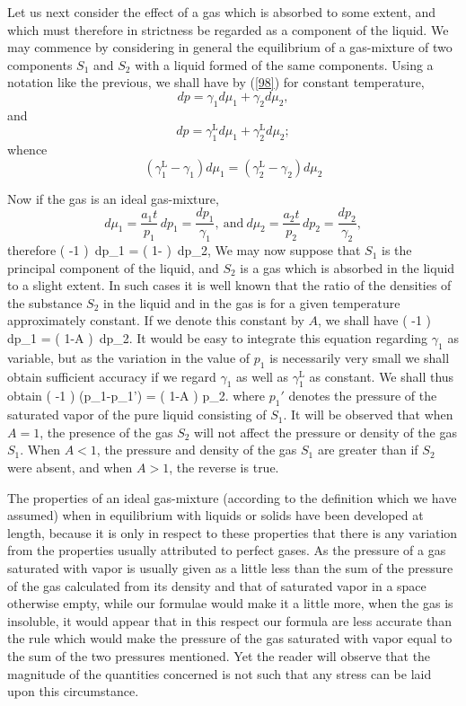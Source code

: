 \documentclass[12pt]{article}
\begin{document}
Let us next consider the effect of a gas which is absorbed to some extent, and which must therefore in strictness be regarded as a component of the liquid. We may commence by considering in general the equilibrium of a gas-mixture of two components $S_1$ and $S_2$ with a liquid formed of the same components. Using a notation like the previous, we shall have by (\ref{98}) for constant temperature,
$$dp = \gamma_1 d \mu_1 + \gamma_2 d\mu_2,  $$
and                  $$dp = \gamma_1^{\text{L}} d \mu_1 + \gamma_2^{\text{L}} d\mu_2;$$
whence             $$(\gamma_1^\text{L} - \gamma_1) d\mu_1 = (\gamma_2^\text{L} - \gamma_2) d\mu_2$$

Now if the gas is an ideal gas-mixture,
$$ d \mu_1 = \frac{a_1 t}{p_1}  \, dp_1 = \frac{dp_1}{\gamma_1},  \ \text{and} \ d \mu_2 = \frac{a_2 t}{p_2}  \, dp_2  =\frac{dp_2}{\gamma_2},  $$ 
therefore 
\eqs   \left(  -1 \right)\, dp_1 =  \left( 1-  \right)\, dp_2,     \label{288}\eqe
We may now suppose that $S_1$ is the principal component of the liquid, and $S_2$ is a gas which is absorbed in the liquid to a slight extent. In such cases it is well known that the ratio of the densities of the substance $S_2$ in the liquid and in the gas is for a given temperature approximately constant. If we denote this constant by $A$, we shall have
\eqs \left(  -1 \right)\, dp_1 =  \left( 1-A \right)\, dp_2.  \label{289}\eqe
It would be easy to integrate this equation regarding $\gamma_1$ as variable, but as the variation in the value of $p_1$ is necessarily very small we shall obtain sufficient accuracy if we regard $\gamma_1$ as well as $\gamma_1^\text{L}$ as constant. We shall thus obtain
\eqs  \left(  -1 \right) (p_1-p_1') =  \left( 1-A \right) p_2.  \label{290}\eqe
where $p_1'$ denotes the pressure of the saturated vapor of the pure liquid consisting of $S_1$. It will be observed that when $A =1$, the presence of the gas $S_2$ will not affect the pressure or density of the gas $S_1$. When $A < 1$, the pressure and density of the gas $S_1$ are greater than if $S_2$ were absent, and when $A > 1$, the reverse is true.


The properties of an ideal gas-mixture (according to the definition which we have assumed) when in equilibrium with liquids or solids have been developed at length, because it is only in respect to these properties that there is any variation from the properties usually attributed to perfect gases. As the pressure of a gas saturated with vapor is usually given as a little less than the sum of the pressure of the gas calculated from its density and that of saturated vapor in a space otherwise empty, while our formulae would make it a little more, when the gas is insoluble, it would appear that in this respect our formula are less accurate than the rule which would make the pressure of the gas saturated with vapor equal to the sum of the two pressures mentioned. Yet the reader will observe that the magnitude of the quantities concerned is not such that any stress can be laid upon this circumstance.
\end{document}
